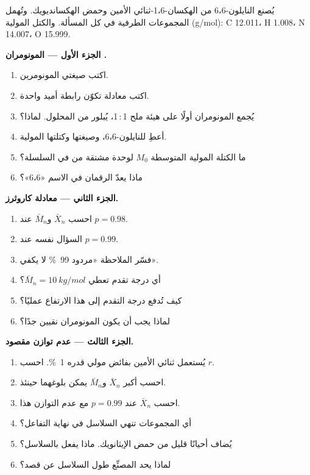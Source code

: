 \begin{problem}
\label{pb:b2:polymer-synthesis:1}
يُصنع النايلون-6،6 من الهكسان-1،6-ثنائي الأمين وحمض الهكسانديويك. وتُهمل المجموعات الطرفية في كل المسألة.
والكتل المولية (\unit{g/mol}): C 12.011، H 1.008، N 14.007، O 15.999.

\medskip
\noindent\textbf{الجزء الأول --- المونومران .}
\begin{enumerate}
  \item اكتب صيغتي المونومرين.
  \item اكتب معادلة تكوّن رابطة أميد واحدة.
  \item يُجمع المونومران أولًا على هيئة ملح 1\,:\,1، يُبلور من المحلول. لماذا؟
  \item أعطِ  للنايلون-6،6، وصيغتها وكتلتها المولية.
  \item ما الكتلة المولية المتوسطة $M_0$ لوحدة مشتقة من  في السلسلة؟
  \item ماذا يعدّ الرقمان في الاسم «6،6»؟
\end{enumerate}

\medskip
\noindent\textbf{الجزء الثاني --- معادلة كاروثرز.}
\begin{enumerate}[resume]
  \item احسب $\bar X_n$ و$\bar M_n$ عند $p = 0.98$.
  \item السؤال نفسه عند $p = 0.99$.
  \item فسّر الملاحظة «مردود 99~\% لا يكفي».
  \item أي درجة تقدم تعطي $\bar M_n = \qty{10}{kg/mol}$؟
  \item كيف تُدفع درجة التقدم إلى هذا الارتفاع عمليًا؟
  \item لماذا يجب أن يكون المونومران نقيين جدًا؟
\end{enumerate}

\medskip
\noindent\textbf{الجزء الثالث --- عدم توازن مقصود.}
\begin{enumerate}[resume]
  \item يُستعمل ثنائي الأمين بفائض مولي قدره 1~\%. احسب $r$.
  \item احسب أكبر $\bar X_n$ و$\bar M_n$ يمكن بلوغهما حينئذ.
  \item احسب $\bar X_n$ عند $p = 0.99$ مع عدم التوازن هذا.
  \item أي المجموعات تنهي السلاسل في نهاية التفاعل؟
  \item يُضاف أحيانًا قليل من حمض الإيثانويك. ماذا يفعل بالسلاسل؟
  \item لماذا يحد المصنِّع طول السلاسل عن قصد؟
\end{enumerate}


\end{problem}
